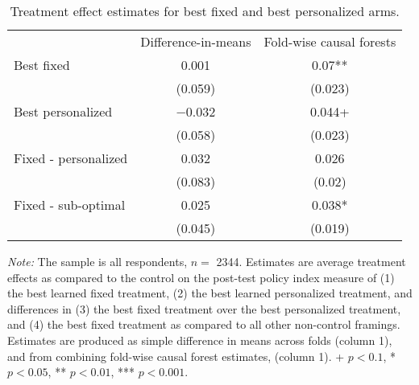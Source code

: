 \begin{table*}

\caption{\label{tab:unnamed-chunk-14}Treatment effect estimates for best fixed and best personalized arms. \label{tab:best_framing}}
\centering
\begin{threeparttable}
\begin{tabular}[t]{lcc}
\toprule
 & Difference-in-means & Fold-wise causal forests\\
\cmidrule(lr){2-2} \cmidrule(lr){3-3}
Best fixed & \num{0.001} & \num{0.07}**\\
 & (\num{0.059}) & (\num{0.023})\\
\addlinespace
Best personalized & \num{-0.032} & \num{0.044}+\\
 & (\num{0.058}) & (\num{0.023})\\
\cmidrule(lr){2-2} \cmidrule(lr){3-3}
\addlinespace
Fixed - personalized & \num{0.032} & \num{0.026}\\
 & (\num{0.083}) & (\num{0.02})\\
\addlinespace
Fixed - sub-optimal & \num{0.025} & \num{0.038}*\\
 & (\num{0.045}) & (\num{0.019})\\
\bottomrule
\end{tabular}
\begin{tablenotes}
\item \footnotesize \textit{Note:} The sample is all respondents, $n = $ \num{2344}. Estimates are average treatment effects as compared to the control on the post-test policy index measure of (1) the best learned fixed treatment, (2) the best learned personalized treatment, and differences in (3) the best fixed treatment over the best personalized treatment, and (4) the best fixed treatment as compared to all other non-control framings. Estimates are produced as simple difference in means across folds (column 1), and from combining fold-wise causal forest estimates, (column 1). + $p < 0.1$, * $p < 0.05$, ** $p < 0.01$, *** $p < 0.001$.
\end{tablenotes}
\end{threeparttable}
\end{table*}
